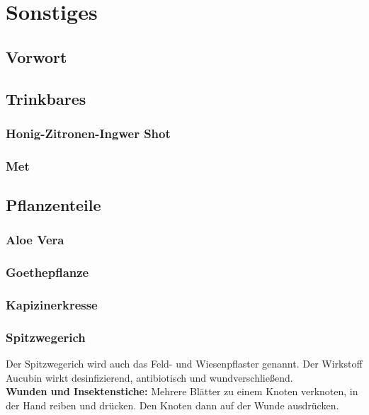 \chapter{Sonstiges}

\section{Vorwort}

\lipsum[1-5]
\newpage





\section{Trinkbares}


\subsection{Honig-Zitronen-Ingwer Shot}


\subsection{Met}



\section{Pflanzenteile}


\subsection{Aloe Vera}


\subsection{Goethepflanze}


\subsection{Kapizinerkresse}


\subsection{Spitzwegerich}

Der Spitzwegerich wird auch das Feld- und Wiesenpflaster genannt. Der Wirkstoff Aucubin wirkt desinfizierend, antibiotisch und wundverschließend.~\cite{swrhandwerkskunst}\\
\textbf{Wunden und Insektenstiche:} Mehrere Blätter zu einem Knoten verknoten, in der Hand reiben und drücken. Den Knoten dann auf der Wunde ausdrücken.\\ \\

